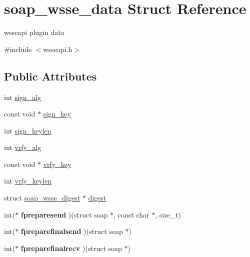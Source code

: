 \hypertarget{structsoap__wsse__data}{
\section{soap\_\-wsse\_\-data Struct Reference}
\label{structsoap__wsse__data}
}


wsseapi plugin data  




{\ttfamily \#include $<$wsseapi.h$>$}

\subsection*{Public Attributes}
\begin{DoxyCompactItemize}
\item 
int \hyperlink{structsoap__wsse__data_ab80ddb3bc30b87b29c746e4408d8cca2}{sign\_\-alg}
\item 
const void $\ast$ \hyperlink{structsoap__wsse__data_a92d1d29c172b8194691fbe73b83e6b38}{sign\_\-key}
\item 
int \hyperlink{structsoap__wsse__data_afc850594dea904592802775184228cea}{sign\_\-keylen}
\item 
int \hyperlink{structsoap__wsse__data_a0d9a91454240aedf7f709e890719c3f2}{vrfy\_\-alg}
\item 
const void $\ast$ \hyperlink{structsoap__wsse__data_a04590479dd85a245d09c74c603df82c3}{vrfy\_\-key}
\item 
int \hyperlink{structsoap__wsse__data_ab0f9414e23e38f719df0fe0e47bbb645}{vrfy\_\-keylen}
\item 
struct \hyperlink{structsoap__wsse__digest}{soap\_\-wsse\_\-digest} $\ast$ \hyperlink{structsoap__wsse__data_a2f87a84ed57ff262fad7501f4cc27625}{digest}
\item 
\hypertarget{structsoap__wsse__data_a0d3fb6a6810a28f51047ac0d941257af}{
int($\ast$ {\bfseries fpreparesend} )(struct soap $\ast$, const char $\ast$, size\_\-t)}
\label{structsoap__wsse__data_a0d3fb6a6810a28f51047ac0d941257af}

\item 
\hypertarget{structsoap__wsse__data_aac9b2449cb81ffab99d034e0fffcc075}{
int($\ast$ {\bfseries fpreparefinalsend} )(struct soap $\ast$)}
\label{structsoap__wsse__data_aac9b2449cb81ffab99d034e0fffcc075}

\item 
\hypertarget{structsoap__wsse__data_a78fa6672db1175d0e8aabf849285af57}{
int($\ast$ {\bfseries fpreparefinalrecv} )(struct soap $\ast$)}
\label{structsoap__wsse__data_a78fa6672db1175d0e8aabf849285af57}


\end{DoxyCompactItemize}
